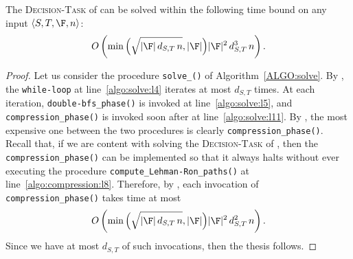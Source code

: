 \begin{proposition}\label{prop:complexity_solve_decision}
The \textsc{Decision-Task} of {\mainproblem} can be solved within the following time bound
on any input $\langle S, T, \F, n \rangle$:
\[
O\left(\min\Big(\sqrt{|\F|\, d_{S,T}\, n}, |\F|\Big) |\F|^2\, d^3_{S,T}\, n \right).
\]
\end{proposition}
\begin{proof}
Let us consider the procedure \texttt{solve\_\mainproblem()} of Algorithm~\ref{ALGO:solve}.
By , the \texttt{while-loop} at line~\ref{algo:solve:l4} iterates at most $d_{S,T}$ times.
At each iteration, \texttt{double-bfs\_phase()} is invoked at line~\ref{algo:solve:l5},
and \texttt{compression\_phase()} is invoked soon after at line~\ref{algo:solve:l11}.
By , the most expensive one between the two procedures is clearly \texttt{compression\_phase()}.
Recall that, if we are content with solving the \textsc{Decision-Task} of {\mainproblem},
then the \texttt{compression\_phase()} can be implemented so that it always halts without
ever executing the  procedure \texttt{compute\_Lehman-Ron\_paths()} at line~\ref{algo:compression:l8}.
Therefore, by ,
each invocation of \texttt{compression\_phase()} takes time at most
$$O\left(\min\Big(\sqrt{|\F|\, d_{S,T}\, n}, |\F|\Big) |\F|^2\, d^2_{S,T}\, n \right).$$
Since we have at most $d_{S,T}$ of such invocations, then the thesis follows.
\end{proof}

